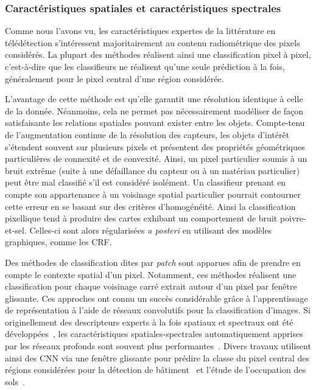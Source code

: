 \subsubsection{Caractéristiques spatiales et caractéristiques spectrales}

Comme nous l'avons vu, les caractéristiques expertes de la littérature en télédétection s'intéressent majoritairement au contenu radiométrique des pixels considérés. La plupart des méthodes réalisent ainsi une classification pixel à pixel, c'est-à-dire que les classifieurs ne réalisent qu'une seule prédiction à la fois, généralement pour le pixel central d'une région considérée.

L'avantage de cette méthode est qu'elle garantit une résolution identique à celle de la donnée. Néanmoins, cela ne permet pas nécessairement modéliser de façon satisfaisante les relations spatiales pouvant exister entre les objets. Compte-tenu de l'augmentation continue de la résolution des capteurs, les objets d'intérêt s'étendent souvent sur plusieurs pixels et présentent des propriétés géométriques particulières de connexité et de convexité. Ainsi, un pixel particulier soumis à un bruit extrême (suite à une défaillance du capteur ou à un matériau particulier) peut être mal classifié s'il est considéré isolément. Un classifieur prenant en compte son appartenance à un voisinage spatial particulier pourrait contourner cette erreur en se basant sur des critères d'homogénéité. Ainsi la classification pixellique tend à produire des cartes exhibant un comportement de bruit poivre-et-sel. Celles-ci sont alors régularisées \emph{a posteri} en utilisant des modèles graphiques, comme les \gls{CRF}.

Des méthodes de classification dites par \emph{patch} sont apparues afin de prendre en compte le contexte spatial d'un pixel. Notamment, ces méthodes réalisent une classification pour chaque voisinage carré extrait autour d'un pixel par fenêtre glissante. Ces approches ont connu un succès considérable grâce à l'apprentissage de représentation à l'aide de réseaux convolutifs pour la classification d'images. Si originellement des descripteurs experts à la fois spatiaux et spectraux ont été développées~\cite{fauvel_advances_2013}, les caractéristiques spatiales-spectrales automatiquement apprises par les réseaux profonds sont souvent plus performantes~\cite{nogueira_learning_2016,chen_deep_2016}. Divers travaux utilisent ainsi des \gls{CNN} via une fenêtre glissante pour prédire la classe du pixel central des régions considérées pour la détection de bâtiment~\cite{vakalopoulou_building_2015} et l'étude de l'occupation des sols~\cite{papadomanolaki_patch-based_2017}.

